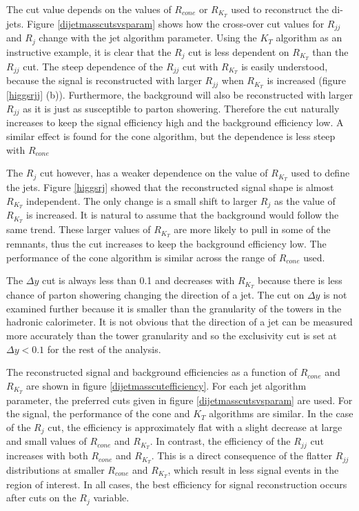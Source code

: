 The cut value depends on the values of $R_{cone}$ or $R_{K_T}$ used to reconstruct the di-jets. Figure \ref{dijetmasscutsvsparam} shows how the cross-over cut values for $R_{jj}$ and $R_{j}$ change with the jet algorithm parameter. 
Using the $K_T$ algorithm as an instructive example, it is clear that the $R_j$ cut is less dependent on $R_{K_T}$ than the $R_{jj}$ cut. The steep dependence of the $R_{jj}$ cut with $R_{K_T}$ is easily understood, because the signal is reconstructed with larger $R_{jj}$ when $R_{K_T}$ is increased (figure \ref{higgsrjj} (b)). 
Furthermore, the background will also be reconstructed with larger $R_{jj}$ as it is just as susceptible to parton showering. Therefore the cut naturally increases to keep the signal efficiency high and the background efficiency low. A similar effect is found for the cone algorithm, but the dependence is less steep with $R_{cone}$

The $R_j$ cut however, has a weaker dependence on the value of $R_{K_T}$ used to define the jets. Figure \ref{higgsrj} showed that the reconstructed signal shape is almost $R_{K_T}$ independent. The only change is a small shift to larger $R_{j}$ as the value of $R_{K_T}$ is increased. It is natural to assume that the background would follow the same trend. These larger values of $R_{K_T}$ are more likely to pull in some of the remnants, thus the cut increases to keep the background efficiency low. The performance of the cone algorithm is similar across the range of $R_{cone}$ used. 

The $\Delta y$ cut is always less than 0.1 and decreases with $R_{K_T}$ because there is less chance of parton showering changing the direction of a jet.  The cut on $\Delta y$ is not examined further because it is smaller than the granularity of the towers in the hadronic calorimeter. It is not obvious that the direction of a jet can be measured more accurately than the tower granularity and so the exclusivity cut is set at $\Delta y < 0.1$ for the rest of the analysis.

The reconstructed signal and background efficiencies as a function of $R_{cone}$ and $R_{K_T}$ are shown in figure \ref{dijetmasscutefficiency}. For each jet algorithm parameter, the preferred cuts given in figure \ref{dijetmasscutsvsparam} are used. 
For the signal, the performance of the cone and $K_T$ algorithms are similar. In the case of the $R_j$ cut, the efficiency is approximately flat with a slight decrease at large and small values of $R_{cone}$ and $R_{K_T}$. In contrast, the efficiency of the $R_{jj}$ cut increases with both $R_{cone}$ and $R_{K_T}$. This is a direct consequence of the flatter $R_{jj}$ distributions at smaller $R_{cone}$ and $R_{K_T}$, which result in less signal events in the region of interest. In all cases, the best efficiency for signal reconstruction occurs after cuts on the $R_j$ variable. 

